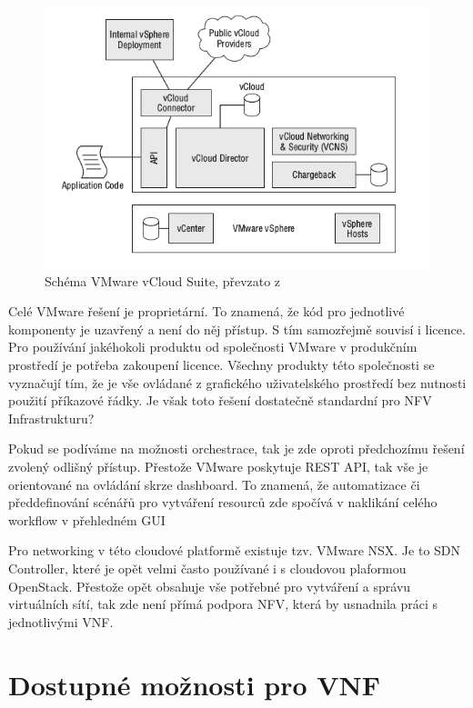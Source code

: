 \begin{figure}[h]
\begin{centering}
\includegraphics[scale=0.75]{images/vmware}
\par\end{centering}
\caption{Schéma VMware vCloud Suite, převzato z \cite{vmware_obrazek}\label{fig:vmware}}
\end{figure}

Celé VMware řešení je proprietární. To znamená, že kód pro jednotlivé komponenty je uzavřený a není do něj přístup. S tím samozřejmě souvisí i licence. Pro používání jakéhokoli produktu od společnosti VMware v produkčním prostředí je potřeba zakoupení licence. Všechny produkty této společnosti se vyznačují tím, že je vše ovládané z grafického uživatelského prostředí bez nutnosti použití příkazové řádky. Je však toto řešení dostatečně standardní pro NFV Infrastrukturu?

Pokud se podíváme na možnosti orchestrace, tak je zde oproti předchozímu řešení zvolený odlišný přístup. Přestože VMware poskytuje REST API, tak vše je orientované na ovládání skrze dashboard. To znamená, že automatizace či předdefinování scénářů pro vytváření resourců zde spočívá v naklikání celého workflow v přehledném GUI

Pro networking v této cloudové platformě existuje tzv. VMware NSX. Je to SDN Controller, které je opět velmi často používané i s cloudovou plaformou OpenStack. Přestože opět obsahuje vše potřebné pro vytváření a správu virtuálních sítí, tak zde není přímá podpora NFV, která by usnadnila práci s jednotlivými VNF.


\section{Dostupné možnosti pro VNF} \label{sec:VNF}

